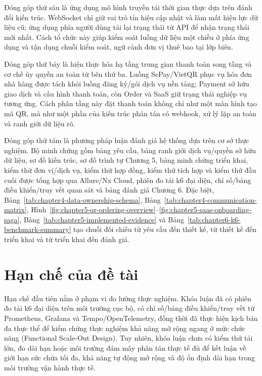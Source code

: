 Đóng góp thứ sáu là ứng dụng mô hình truyền tải thời gian thực dựa trên đánh đổi kiến trúc. WebSocket chỉ giữ vai trò tín hiệu cập nhật và làm mất hiệu lực dữ liệu cũ; ứng dụng phía người dùng tải lại trạng thái từ API để nhận trạng thái mới nhất. Cách tổ chức này giúp kiểm soát luồng dữ liệu một chiều ở phía ứng dụng và tận dụng chuỗi kiểm soát, ngữ cảnh đơn vị thuê bao tại lớp biên.

Đóng góp thứ bảy là hiện thực hóa hạ tầng trung gian thanh toán song tầng và cơ chế ủy quyền an toàn từ bên thứ ba. Luồng SePay/VietQR phục vụ hóa đơn nhà hàng được tách khỏi luồng đăng ký/gói dịch vụ nền tảng; Payment sở hữu giao dịch và cấu hình thanh toán, còn Order và SaaS giữ trạng thái nghiệp vụ tương ứng. Cách phân tầng này đặt thanh toán không chỉ như một màn hình tạo mã QR, mà như một phần của kiến trúc phân tán có webhook, xử lý lặp an toàn và ranh giới dữ liệu rõ.

Đóng góp thứ tám là phương pháp luận đánh giá hệ thống dựa trên cơ sở thực nghiệm. Bộ minh chứng gồm bảng yêu cầu, bảng ranh giới dịch vụ/quyền sở hữu dữ liệu, sơ đồ kiến trúc, sơ đồ trình tự Chương 5, bảng minh chứng triển khai, kiểm thử đơn vị/dịch vụ, kiểm thử hợp đồng, kiểm thử tích hợp và kiểm thử đầu cuối được tổng hợp qua Allure/Nx Cloud, phiên đo tải k6 đại diện, chỉ số/bảng điều khiển/truy vết quan sát và bảng đánh giá Chương 6. Đặc biệt, Bảng~\ref{tab:chapter4-data-ownership-schema}, Bảng~\ref{tab:chapter4-communication-matrix}, Hình~\ref{fig:chapter5-qr-ordering-overview}--\ref{fig:chapter5-saas-onboarding-saga}, Bảng~\ref{tab:chapter5-implemented-evidence} và Bảng~\ref{tab:chapter6-k6-benchmark-summary} tạo chuỗi đối chiếu từ yêu cầu đến thiết kế, từ thiết kế đến triển khai và từ triển khai đến đánh giá.

\section{Hạn chế của đề tài}

Hạn chế đầu tiên nằm ở phạm vi đo lường thực nghiệm. Khóa luận đã có phiên đo tải k6 đại diện trên môi trường cục bộ, có chỉ số/bảng điều khiển/truy vết từ Prometheus, Grafana và Tempo/OpenTelemetry, đồng thời đã thực hiện kịch bản đa thực thể để kiểm chứng thực nghiệm khả năng mở rộng ngang ở mức chức năng (Functional Scale-Out Design). Tuy nhiên, khóa luận chưa có kiểm thử tải lớn, đo dài hạn hoặc môi trường đám mây phân tán thực tế đủ để kết luận về giới hạn sức chứa tối đa, khả năng tự động mở rộng và độ ổn định dài hạn trong môi trường vận hành thực tế.

